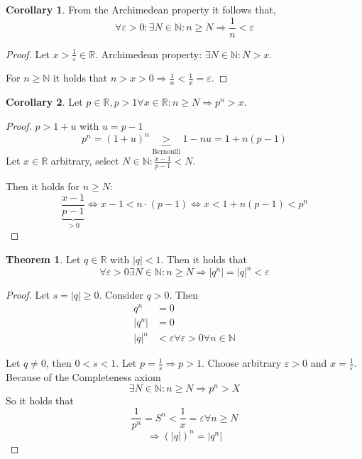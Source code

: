 \documentclass[a4paper,landscape,twocolumn]{article}
\theoremstyle{definition}
\newtheorem{theorem}{Theorem}
\newtheorem{cor}{Corollary}
\newcommand\abs[1]{\left|#1\right|}
\begin{document}
\begin{cor}
  From the Archimedean property it follows that,
  \[ \forall \varepsilon > 0: \exists N \in \mathbb N: n \geq N \Rightarrow \frac1n < \varepsilon \]
\end{cor}

\begin{proof}
  Let $x > \frac1\varepsilon \in \mathbb R$.
  Archimedean property: $\exists N \in \mathbb N: N > x$.

  For $n \geq \mathbb N$ it holds that $n > x > 0 \Rightarrow \frac1n < \frac1x = \varepsilon$.
\end{proof}

\begin{cor}
  Let $p \in \mathbb R, p > 1 \forall x \in \mathbb R: n \geq N \Rightarrow p^n > x$.
\end{cor}

\begin{proof}
  $p > 1 + u$ with $u = p - 1$
  \[ p^n = (1 + u)^n \underbrace{>}_{\text{Bernoulli}} 1 - nu = 1 + n(p-1) \]
  Let $x \in \mathbb R$ arbitrary, select $N \in \mathbb N: \frac{x-1}{p-1} < N$.

  Then it holds for $n \geq N:$
  \[
    \frac{x-1}{\underbrace{p-1}_{>0}}
    \Leftrightarrow x - 1 < n\cdot(p-1)
    \Leftrightarrow x < 1 + n(p-1) < p^n
  \]
\end{proof}

\begin{theorem}
  Let $q \in \mathbb R$ with $\abs{q} < 1$. Then it holds that
  \[
    \forall \varepsilon > 0 \exists N \in \mathbb N:
    n \geq N \Rightarrow \abs{q^n} = \abs{q}^n < \varepsilon
  \]
\end{theorem}

\begin{proof}
  Let $s = \abs{q} \geq 0$. Consider $q > 0$. Then
  \begin{align*}
    q^n &= 0 \\
    \abs{q^n} &= 0 \\
    \abs{q}^n &< \varepsilon \forall \varepsilon > 0 \forall n \in \mathbb N
  \end{align*}

  Let $q \neq 0$, then $0 < s < 1$. Let $p = \frac1s \Rightarrow p > 1$.
  Choose arbitrary $\varepsilon > 0$ and $x = \frac1\varepsilon$.
  Because of the Completeness axiom
  \[ \exists N \in \mathbb N: n \geq N \Rightarrow p^n > X \]
  So it holds that
  \[ \frac1{p^n} = S^n < \frac1x = \varepsilon \forall n \geq N \]
  \[ \Rightarrow \left(\abs{q}\right)^n = \abs{q^n} \]
\end{proof}
\end{document}
